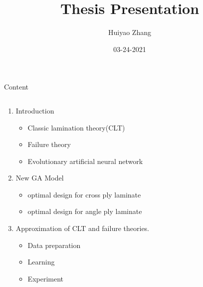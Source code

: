 \documentclass{beamer}
\title{Thesis Presentation}
\author{Huiyao Zhang}
\institute{Kyoto Institue of Technology}
\date{03-24-2021}
\begin{document}
\begin{frame}
    \titlepage
\end{frame}

\begin{frame}[c]{Content} 
	\begin{columns}
		\begin{column}{0.8\textwidth}
			\begin{enumerate}[I]
				\item Introduction
					\begin{itemize}
						\item Classic lamination theory(CLT) 
        				\item Failure theory 
						\item Evolutionary artificial neural network
					\end{itemize}
				\item New GA Model
					\begin{itemize}
						\item optimal design for cross ply laminate
						\item optimal design for angle ply laminate
					\end{itemize}
				\item Approximation of CLT and failure theories.
					\begin{itemize}
						\item Data preparation
						\item Learning
						\item Experiment
					\end{itemize}
			\end{enumerate}
		\end{column}
	\end{columns}
\end{frame}
\end{document}
